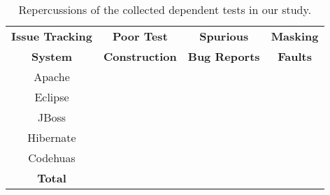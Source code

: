 \begin{table}
\centering
\setlength{\tabcolsep}{0.3\tabcolsep}
\begin{tabular}{|c||c|c|c|}
\hline
\textbf{Issue Tracking} & \textbf{Poor Test} & \textbf{Spurious} & \textbf{Masking} \\
\textbf{System } & \textbf{Construction} & \textbf{Bug Reports}
& \textbf{Faults}  \\
\hline
Apache & & & \\
\hline
Eclipse & & & \\
\hline
JBoss& & & \\
\hline
Hibernate& & & \\
\hline
Codehuas& & & \\
\hline
\hline
\textbf{Total} & & & \\
\hline
\end{tabular}
\caption{
Repercussions of the collected dependent tests in our study.
}
\label{tab:reper}
\end{table}
